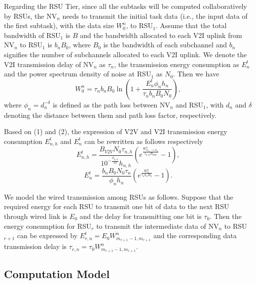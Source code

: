 \documentclass[lettersize,journal]{IEEEtran}
\begin{document}
Regarding the RSU Tier, since all the subtasks will be computed collaboratively by RSUs, the NV$_n$ needs to transmit the initial task data (i.e., the input data of the first subtask), with the data size $W^n_0$, to RSU$_1$. Assume that the total bandwidth of RSU$_1$ is $B$ and the bandwidth allocated to each V2I uplink from NV$_n$ to RSU$_1$ is $b_nB_0$, where $B_0$ is the bandwidth of each subchannel and $b_n$ signifies the number of subchannels allocated to each V2I uplink. We denote the V2I transmission delay of NV$_n$ as $\tau_{n}$, the transmission energy consumption as $E^t_{n}$ and the power spectrum density of noise at RSU$_1$ as $N_0$. Then we have\\
\begin{equation*}
W^n_0=\tau_{n}b_nB_0\ln\left(1+\dfrac{E_n^t \phi_n h_n}{\tau_{n}b_nB_0N_0}\right), \tag{2}
\end{equation*}
where $\phi_n = d_{n}^{-\delta}$ \cite{ref21} is defined as the path loss between NV$_n$ and RSU$_1$, with $d_{n}$ and $\delta$ denoting the distance between them and path loss factor, respectively.

Based on (1) and (2), the expression of V2V and V2I transmission energy consumption $E_{n,h}^t$ and $E_n^t$ can be rewritten as follows respectively\\
\begin{equation*}
E_{n,h}^t=\frac{B_{V2V}N_0\tau_{n,h}}{10^{-\frac{\phi_{n,h}}{10}} h_{n,h}}\left(e^{\frac{W_{m_h-1,m_h}^n}{\tau_{n,h}B_{V2V}}}-1\right), \tag{3}
\end{equation*}
\begin{equation*}
E^t_n=\dfrac{b_nB_0N_0\tau_{n}}{\phi_n h_n}\left(e^{\frac{W^n_0}{\tau_{n}b_nB_0}}-1\right). \tag{4}
\end{equation*}

We model the wired transmission among RSUs as follows. Suppose that the required energy for each RSU to transmit one bit of data to the next RSU through wired link is $E_0$ and the delay for transmitting one bit is $\tau_0$. Then the energy consumption for RSU$_r$ to transmit the intermediate data of NV$_n$ to RSU$_{r+1}$ can be expressed by $E^t_{r,n}=E_0W^n_{m_{r+1}-1,m_{r+1}}$ and the corresponding data transmission delay is $\tau_{r,n}=\tau_0W^n_{m_{r+1}-1,m_{r+1}}$.


\subsection{Computation Model}
\end{document}
